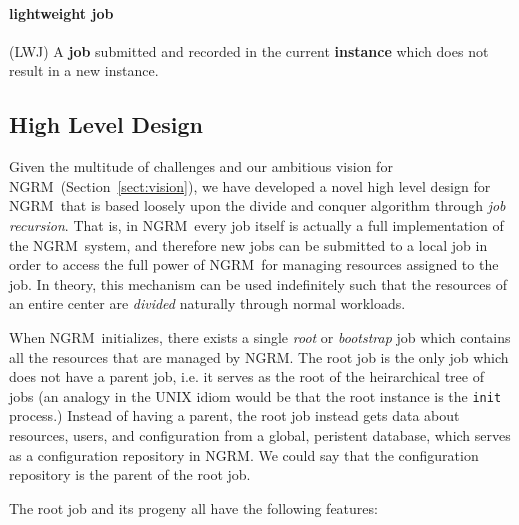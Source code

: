 \documentclass{article}
\newcommand{\ngrm}{NGRM}
\begin{document}
\paragraph{lightweight job} (LWJ) 
A {\bf job} submitted and recorded in the current {\bf instance}
which does not result in a new instance.

\subsection{High Level Design}

Given the multitude of challenges and our ambitious vision for
\ngrm\ (Section~\ref{sect:vision}), we have developed a novel
high level design for \ngrm\ that is based loosely upon the
divide and conquer algorithm through {\em job recursion}. That
is, in \ngrm\ every job itself is actually a full implementation
of the \ngrm\ system, and therefore new jobs can be submitted to a
local job in order to access the full power of \ngrm\ for managing
resources assigned to the job. In theory, this mechanism can be
used indefinitely such that the resources of an entire center
are {\em divided} naturally through normal workloads.  

When \ngrm\ initializes, there exists a single {\em root} or {\em
bootstrap} job which contains all the resources that are managed
by \ngrm. The root job is the only job which does not have a
parent job, i.e. it serves as the root of the heirarchical tree of
jobs (an analogy in the UNIX idiom would be that the root instance
is the {\tt init} process.) Instead of having a parent, the root
job instead gets data about resources, users, and configuration
from a global, peristent database, which serves as a configuration
repository in \ngrm. We could say that the configuration repository
is the parent of the root job.

The root job and its progeny all have the following features:
\end{document}
